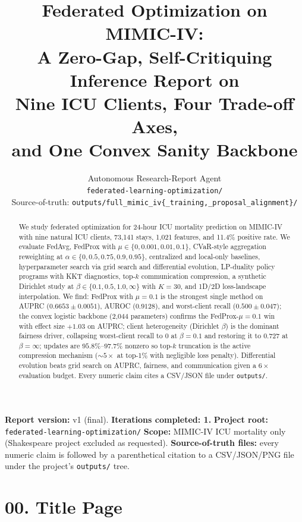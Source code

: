 \documentclass{article}
\title{Federated Optimization on MIMIC-IV: \\
A Zero-Gap, Self-Critiquing Inference Report on \\
Nine ICU Clients, Four Trade-off Axes, \\
and One Convex Sanity Backbone}
\author{%
  Autonomous Research-Report Agent \\
  \texttt{federated-learning-optimization/} \\
  \And
  Source-of-truth: \texttt{outputs/full\_mimic\_iv\{\_training,\_proposal\_alignment\}/} \\
}
\begin{document}
\maketitle

\begin{abstract}
We study federated optimization for 24-hour ICU mortality prediction on MIMIC-IV with nine natural ICU clients, 73{,}141 stays, 1{,}021 features, and 11.4\% positive rate. We evaluate FedAvg, FedProx with $\mu \in \{0, 0.001, 0.01, 0.1\}$, CVaR-style aggregation reweighting at $\alpha \in \{0, 0.5, 0.75, 0.9, 0.95\}$, centralized and local-only baselines, hyperparameter search via grid search and differential evolution, LP-duality policy programs with KKT diagnostics, top-$k$ communication compression, a synthetic Dirichlet study at $\beta \in \{0.1, 0.5, 1.0, \infty\}$ with $K=30$, and 1D/2D loss-landscape interpolation. We find: FedProx with $\mu=0.1$ is the strongest single method on AUPRC ($0.6653 \pm 0.0051$), AUROC ($0.9128$), and worst-client recall ($0.500 \pm 0.047$); the convex logistic backbone (2{,}044 parameters) confirms the FedProx-$\mu = 0.1$ win with effect size $+1.03$ on AUPRC; client heterogeneity (Dirichlet $\beta$) is the dominant fairness driver, collapsing worst-client recall to $0$ at $\beta=0.1$ and restoring it to $0.727$ at $\beta=\infty$; updates are $95.8\%$--$97.7\%$ nonzero so top-$k$ truncation is the active compression mechanism (\(\sim\!5\times\) at top-1\% with negligible loss penalty). Differential evolution beats grid search on AUPRC, fairness, and communication given a $6\times$ evaluation budget. Every numeric claim cites a CSV/JSON file under \texttt{outputs/}.
\end{abstract}

\clearpage
\tableofcontents
\clearpage
\listoftables
\clearpage


\textbf{Report version:} v1 (final). \textbf{Iterations completed: 1.} \textbf{Project root:} \texttt{federated-learning-optimization/} \textbf{Scope:} MIMIC-IV ICU mortality only (Shakespeare project excluded as requested). \textbf{Source-of-truth files:} every numeric claim is followed by a parenthetical citation to a CSV/JSON/PNG file under the project's \texttt{outputs/} tree.



\clearpage
\section{00. Title Page}
\end{document}
